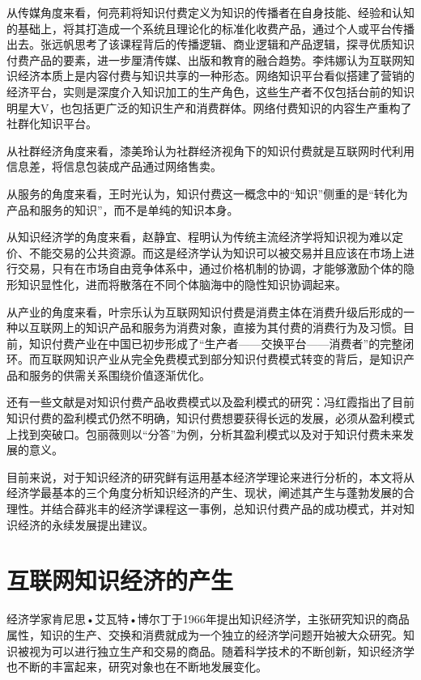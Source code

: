 \documentclass[UTF8,a4paper,12pt]{ctexart}  %
\begin{document}
从传媒角度来看，\citep{何亮莉2018}何亮莉将知识付费定义为知识的传播者在自身技能、经验和认知的基础上，将其打造成一个系统且理论化的标准化收费产品，通过个人或平台传播出去。\citep{张远帆2018}张远帆思考了该课程背后的传播逻辑、商业逻辑和产品逻辑，探寻优质知识付费产品的要素，进一步厘清传媒、出版和教育的融合趋势。\citep{李炜娜2018}李炜娜认为互联网知识经济本质上是内容付费与知识共享的一种形态。网络知识平台看似搭建了营销的经济平台，实则是深度介入知识加工的生产角色，这些生产者不仅包括台前的知识明星大V，也包括更广泛的知识生产和消费群体。网络付费知识的内容生产重构了社群化知识平台。

从社群经济角度来看，漆美玲认为社群经济视角下的知识付费就是互联网时代利用信息差，将信息包装成产品通过网络售卖。\citep{漆美玲2019}

从服务的角度来看，王时光认为，知识付费这一概念中的``知识''侧重的是``转化为产品和服务的知识''，而不是单纯的知识本身。\citep{王时光2019}

从知识经济学的角度来看，赵静宜、程明认为传统主流经济学将知识视为难以定价、不能交易的公共资源。而这是经济学认为知识可以被交易并且应该在市场上进行交易，只有在市场自由竞争体系中，通过价格机制的协调，才能够激励个体的隐形知识显性化，进而将散落在不同个体脑海中的隐性知识协调起来。\citep{赵静宜2019}

从产业的角度来看，叶宗乐认为互联网知识付费是消费主体在消费升级后形成的一种以互联网上的知识产品和服务为消费对象，直接为其付费的消费行为及习惯。目前，知识付费产业在中国已初步形成了``生产者------交换平台------消费者''的完整闭环。而互联网知识产业从完全免费模式到部分知识付费模式转变的背后，是知识产品和服务的供需关系围绕价值逐渐优化。\citep{叶宗乐2018}

还有一些文献是对知识付费产品收费模式以及盈利模式的研究：\citep{冯红霞2018}冯红霞指出了目前知识付费的盈利模式仍然不明确，知识付费想要获得长远的发展，必须从盈利模式上找到突破口。\citep{包丽薇2017}包丽薇则以``分答''为例，分析其盈利模式以及对于知识付费未来发展的意义。

目前来说，对于知识经济的研究鲜有运用基本经济学理论来进行分析的，本文将从经济学最基本的三个角度分析知识经济的产生、现状，阐述其产生与蓬勃发展的合理性。并结合薛兆丰的经济学课程这一事例，总知识付费产品的成功模式，并对知识经济的永续发展提出建议。

\hypertarget{section-1}{%
\section{互联网知识经济的产生}\label{section-1}}

经济学家肯尼思•艾瓦特•博尔丁于1966年提出知识经济学，主张研究知识的商品属性，知识的生产、交换和消费就成为一个独立的经济学问题开始被大众研究。知识被视为可以进行独立生产和交易的商品。随着科学技术的不断创新，知识经济学也不断的丰富起来，研究对象也在不断地发展变化。
\end{document}
